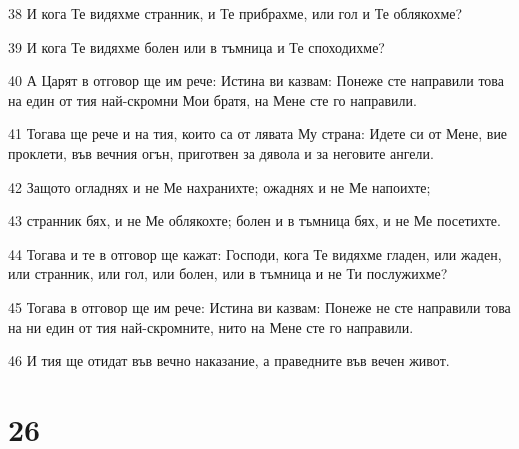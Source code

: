 \par 38 И кога Те видяхме странник, и Те прибрахме, или гол и Те облякохме?
\par 39 И кога Те видяхме болен или в тъмница и Те споходихме?
\par 40 А Царят в отговор ще им рече: Истина ви казвам: Понеже сте направили това на един от тия най-скромни Мои братя, на Мене сте го направили.
\par 41 Тогава ще рече и на тия, които са от лявата Му страна: Идете си от Мене, вие проклети, във вечния огън, приготвен за дявола и за неговите ангели.
\par 42 Защото огладнях и не Ме нахранихте; ожаднях и не Ме напоихте;
\par 43 странник бях, и не Ме облякохте; болен и в тъмница бях, и не Ме посетихте.
\par 44 Тогава и те в отговор ще кажат: Господи, кога Те видяхме гладен, или жаден, или странник, или гол, или болен, или в тъмница и не Ти послужихме?
\par 45 Тогава в отговор ще им рече: Истина ви казвам: Понеже не сте направили това на ни един от тия най-скромните, нито на Мене сте го направили.
\par 46 И тия ще отидат във вечно наказание, а праведните във вечен живот.

\chapter{26}

